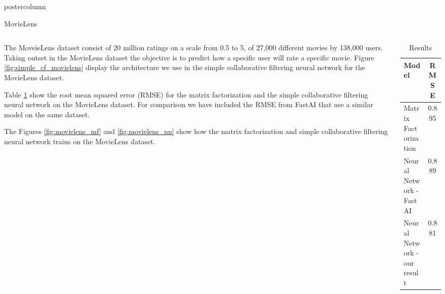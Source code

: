 \documentclass[final,hyperref={pdfpagelabels=false}]{beamer}
\begin{document}
\begin{frame}
\begin{columns}
\begin{column}{.49\paperwidth}
\begin{beamercolorbox}[center,wd=\textwidth]{postercolumn}
\begin{minipage}[T]{.99\textwidth}
{\begin{block}{MovieLens}
\begin{columns}
\begin{column}{1\textwidth}
\begin{minipage}[t]{0.96\textwidth}
\hspace{0.5cm} 
\vspace{-1cm}
\begin{columns}
 \begin{column}{0.60\textwidth}
 \justifying
 \footnotesize{
	The MoveieLens dataset consist of 20 million ratings on a scale from 0.5 to 5, of 27,000 different movies by 138,000 users. Taking outset in the MovieLens dataset the objective is to predict how a specific user will rate a specific movie. Figure \ref{fig:simple_cf_movielens} display the architecture we use in the simple collaborative filtering neural network for the MovieLens dataset.
	
		Table \ref{res:MovieLens_results} show the root mean squared error (RMSE) for the matrix factorization and the simple collaborative filtering neural network on the MovieLens dataset. For comparison we have included the RMSE from FastAI that use a similar model on the same dataset.
	
	The Figures \ref{fig:movielens_mf} and \ref{fig:movielens_nn} show how the matrix factorization and simple collaborative filtering neural network trains on the MovieLens dataset.
	
}
 \end{column}
 \begin{column}{0.39\textwidth}

\begin{table}[h]
\small
\centering
\caption{Results}
\label{res:MovieLens_results}
\begin{tabular}{lc}
\toprule
Model  & RMSE\\
\midrule
Matrix Factorization      &  0.895 \\
Neural Network - FastAI      &  0.889  \\
Neural Network - our result      &  0.881\\
\bottomrule

\end{tabular}
\end{table}

 \end{column}
 \end{columns}
 

\end{minipage}
\end{column}
\end{columns}
\end{block}}
\end{minipage}
\end{beamercolorbox}
\end{column}
\end{columns}
\end{frame}
\end{document}
